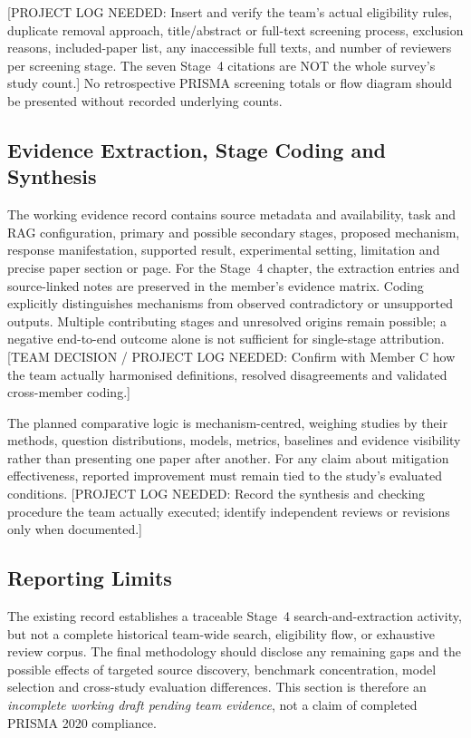 [PROJECT LOG NEEDED: Insert and verify the team's actual eligibility rules, duplicate removal approach, title/abstract or full-text screening process, exclusion reasons, included-paper list, any inaccessible full texts, and number of reviewers per screening stage. The seven Stage~4 citations are NOT the whole survey's study count.] No retrospective PRISMA screening totals or flow diagram should be presented without recorded underlying counts.

\subsection{Evidence Extraction, Stage Coding and Synthesis}
The working evidence record contains source metadata and availability, task and RAG configuration, primary and possible secondary stages, proposed mechanism, response manifestation, supported result, experimental setting, limitation and precise paper section or page. For the Stage~4 chapter, the extraction entries and source-linked notes are preserved in the member's evidence matrix. Coding explicitly distinguishes mechanisms from observed contradictory or unsupported outputs. Multiple contributing stages and unresolved origins remain possible; a negative end-to-end outcome alone is not sufficient for single-stage attribution. [TEAM DECISION / PROJECT LOG NEEDED: Confirm with Member C how the team actually harmonised definitions, resolved disagreements and validated cross-member coding.]

The planned comparative logic is mechanism-centred, weighing studies by their methods, question distributions, models, metrics, baselines and evidence visibility rather than presenting one paper after another. For any claim about mitigation effectiveness, reported improvement must remain tied to the study's evaluated conditions. [PROJECT LOG NEEDED: Record the synthesis and checking procedure the team actually executed; identify independent reviews or revisions only when documented.]

\subsection{Reporting Limits}
The existing record establishes a traceable Stage~4 search-and-extraction activity, but not a complete historical team-wide search, eligibility flow, or exhaustive review corpus. The final methodology should disclose any remaining gaps and the possible effects of targeted source discovery, benchmark concentration, model selection and cross-study evaluation differences. This section is therefore an \emph{incomplete working draft pending team evidence}, not a claim of completed PRISMA 2020 compliance.
